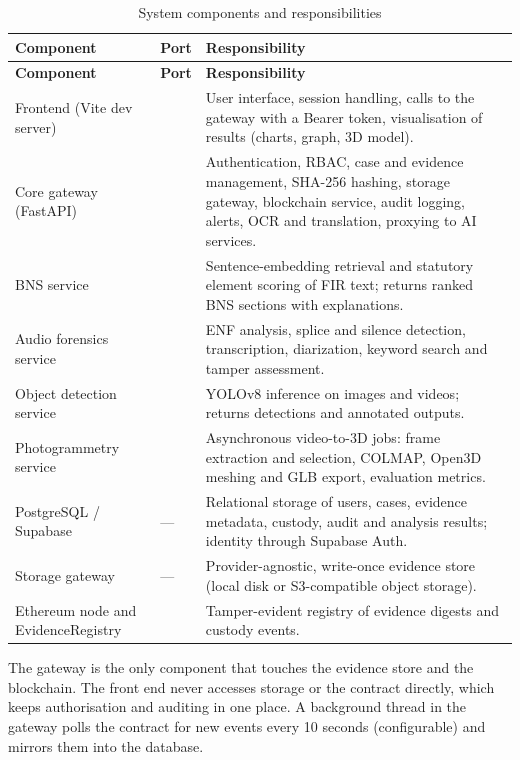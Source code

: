 \documentclass[12pt,a4paper,oneside]{report}
\begin{document}
{\footnotesize
\setlength{\tabcolsep}{3pt}
\renewcommand{\arraystretch}{1.15}
\begin{longtable}{|>{\raggedright\arraybackslash}p{3.79cm}|>{\raggedright\arraybackslash}p{1.42cm}|>{\raggedright\arraybackslash}p{8.99cm}|}
\caption{System components and responsibilities}\\
\hline
\rowcolor{headfill}\textbf{Component} & \textbf{Port} & \textbf{Responsibility} \\ \hline
\endfirsthead
\hline
\rowcolor{headfill}\textbf{Component} & \textbf{Port} & \textbf{Responsibility} \\ \hline
\endhead
\hline \endfoot
Frontend (Vite dev server) & 5173 & User interface, session handling, calls to the gateway with a Bearer token, visualisation of results (charts, graph, 3D model). \\ \hline
Core gateway (FastAPI) & 8000 & Authentication, RBAC, case and evidence management, SHA-256 hashing, storage gateway, blockchain service, audit logging, alerts, OCR and translation, proxying to AI services. \\ \hline
BNS service & 8001 & Sentence-embedding retrieval and statutory element scoring of FIR text; returns ranked BNS sections with explanations. \\ \hline
Audio forensics service & 8002 & ENF analysis, splice and silence detection, transcription, diarization, keyword search and tamper assessment. \\ \hline
Object detection service & 8003 & YOLOv8 inference on images and videos; returns detections and annotated outputs. \\ \hline
Photogrammetry service & 8004 & Asynchronous video-to-3D jobs: frame extraction and selection, COLMAP, Open3D meshing and GLB export, evaluation metrics. \\ \hline
PostgreSQL / Supabase & --- & Relational storage of users, cases, evidence metadata, custody, audit and analysis results; identity through Supabase Auth. \\ \hline
Storage gateway & --- & Provider-agnostic, write-once evidence store (local disk or S3-compatible object storage). \\ \hline
Ethereum node and EvidenceRegistry & 8545 & Tamper-evident registry of evidence digests and custody events. \\ \hline
\end{longtable}
}

The gateway is the only component that touches the evidence store and the blockchain. The front end never accesses storage or the contract directly, which keeps authorisation and auditing in one place. A background thread in the gateway polls the contract for new events every 10 seconds (configurable) and mirrors them into the database.
\end{document}
